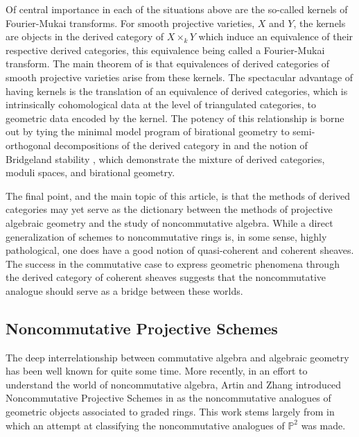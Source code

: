 \documentclass[12pt]{amsart}
\theoremstyle{definition}
\begin{document}
Of central importance in each of the situations above are the so-called kernels of Fourier-Mukai transforms.
For smooth projective varieties, $X$ and $Y$, the kernels are objects in the derived category of $X \times_k Y$ which induce an equivalence of their respective derived categories, this equivalence being called a Fourier-Mukai transform.
The main theorem of \cite{Orlov1997} is that equivalences of derived categories of smooth projective varieties arise from these kernels.
The spectacular advantage of having kernels is the translation of an equivalence of derived categories, which is intrinsically cohomological data at the level of triangulated categories, to geometric data encoded by the kernel.
The potency of this relationship is borne out by tying the minimal model program of birational geometry to semi-orthogonal decompositions of the derived category in \cite{Bridgeland02,kawamata2002} and the notion of Bridgeland stability \cite{Bri07, ABCH13, BM14a, BM14b}, which demonstrate the mixture of derived categories, moduli spaces, and birational geometry.

The final point, and the main topic of this article, is that the methods of derived categories may yet serve as the dictionary between the methods of projective algebraic geometry and the study of noncommutative algebra.
While a direct generalization of schemes to noncommutative rings is, in some sense, highly pathological, one does have a good notion of quasi-coherent and coherent sheaves.
The success in the commutative case to express geometric phenomena through the derived category of coherent sheaves suggests that the noncommutative analogue should serve as a bridge between these worlds.

\subsection*{Noncommutative Projective Schemes}
The deep interrelationship between commutative algebra and algebraic geometry has been well known for quite some time.
More recently, in an effort to understand the world of noncommutative algebra, Artin and Zhang introduced Noncommutative Projective Schemes in \cite{AZ94} as the noncommutative analogues of geometric objects associated to graded rings.
This work stems largely from \cite{AS87} in which an attempt at classifying the noncommutative analogues of $\mathbb{P}^2$ was made.
\end{document}
